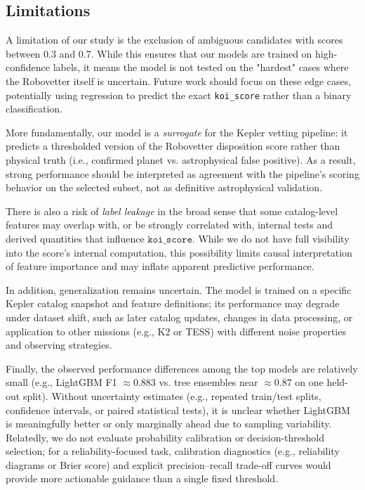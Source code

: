 \subsection{Limitations}
A limitation of our study is the exclusion of ambiguous candidates with scores between 0.3 and 0.7. While this ensures that our models are trained on high-confidence labels, it means the model is not tested on the "hardest" cases where the Robovetter itself is uncertain. Future work should focus on these edge cases, potentially using regression to predict the exact \texttt{koi\_score} rather than a binary classification.

More fundamentally, our model is a \textit{surrogate} for the Kepler vetting pipeline: it predicts a thresholded version of the Robovetter disposition score rather than physical truth (i.e., confirmed planet vs. astrophysical false positive). As a result, strong performance should be interpreted as agreement with the pipeline’s scoring behavior on the selected subset, not as definitive astrophysical validation.

There is also a risk of \textit{label leakage} in the broad sense that some catalog-level features may overlap with, or be strongly correlated with, internal tests and derived quantities that influence $\texttt{koi\_score}$. While we do not have full visibility into the score’s internal computation, this possibility limits causal interpretation of feature importance and may inflate apparent predictive performance.

In addition, generalization remains uncertain. The model is trained on a specific Kepler catalog snapshot and feature definitions; its performance may degrade under dataset shift, such as later catalog updates, changes in data processing, or application to other missions (e.g., K2 or TESS) with different noise properties and observing strategies.

Finally, the observed performance differences among the top models are relatively small (e.g., LightGBM F1 $\approx 0.883$ vs. tree ensembles near $\approx 0.87$ on one held-out split). Without uncertainty estimates (e.g., repeated train/test splits, confidence intervals, or paired statistical tests), it is unclear whether LightGBM is meaningfully better or only marginally ahead due to sampling variability. Relatedly, we do not evaluate probability calibration or decision-threshold selection; for a reliability-focused task, calibration diagnostics (e.g., reliability diagrams or Brier score) and explicit precision--recall trade-off curves would provide more actionable guidance than a single fixed threshold.
